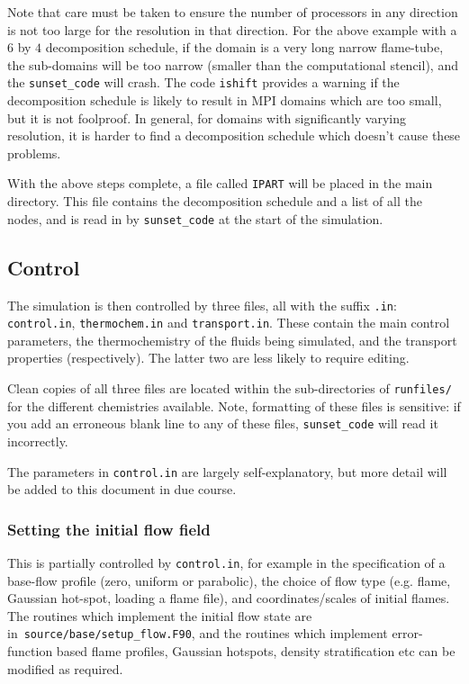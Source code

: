 \documentclass[notitlepage]{revtex4-1}
\begin{document}
Note that care must be taken to ensure the number of processors in any direction is not too large for the resolution in that direction. For the above example with a $6$ by $4$ decomposition schedule, if the domain is a very long narrow flame-tube, the sub-domains will be too narrow (smaller than the computational stencil), and the \verb|sunset_code| will crash. The code \verb|ishift| provides a warning if the decomposition schedule is likely to result in MPI domains which are too small, but it is not foolproof. In general, for domains with significantly varying resolution, it is harder to find a decomposition schedule which doesn't cause these problems.

With the above steps complete, a file called \verb|IPART| will be placed in the main directory. This file contains the decomposition schedule and a list of all the nodes, and is read in by \verb|sunset_code| at the start of the simulation.

\subsection{Control}

The simulation is then controlled by three files, all with the suffix \verb|.in|: \verb|control.in|, \verb|thermochem.in| and \verb|transport.in|. These contain the main control parameters, the thermochemistry of the fluids being simulated, and the transport properties (respectively). The latter two are less likely to require editing.

Clean copies of all three files are located within the sub-directories of \verb|runfiles/| for the different chemistries available. Note, formatting of these files is sensitive: if you add an erroneous blank line to any of these files, \verb|sunset_code| will read it incorrectly.

The parameters in \verb|control.in| are largely self-explanatory, but more detail will be added to this document in due course. 

\subsubsection{Setting the initial flow field}

This is partially controlled by \verb|control.in|, for example in the specification of a base-flow profile (zero, uniform or parabolic), the choice of flow type (e.g. flame, Gaussian hot-spot, loading a flame file), and coordinates/scales of initial flames. The routines which implement the initial flow state are in~\verb|source/base/setup_flow.F90|, and the routines which implement error-function based flame profiles, Gaussian hotspots, density stratification etc can be modified as required.
\end{document}
